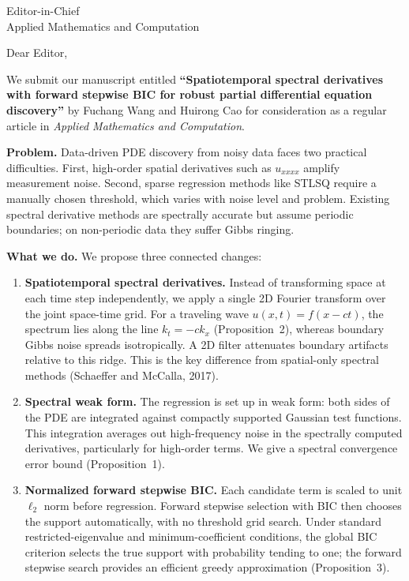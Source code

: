 \documentclass[12pt]{letter}
\begin{document}
\begin{letter}{Editor-in-Chief\\
Applied Mathematics and Computation}

\opening{Dear Editor,}

We submit our manuscript entitled \textbf{``Spatiotemporal spectral derivatives with forward stepwise BIC for robust partial differential equation discovery''} by Fuchang Wang and Huirong Cao for consideration as a regular article in \textit{Applied Mathematics and Computation}.

\textbf{Problem.} Data-driven PDE discovery from noisy data faces two practical difficulties. First, high-order spatial derivatives such as $u_{xxxx}$ amplify measurement noise. Second, sparse regression methods like STLSQ require a manually chosen threshold, which varies with noise level and problem. Existing spectral derivative methods are spectrally accurate but assume periodic boundaries; on non-periodic data they suffer Gibbs ringing.

\textbf{What we do.} We propose three connected changes:

\begin{enumerate}
\item \textbf{Spatiotemporal spectral derivatives.} Instead of transforming space at each time step independently, we apply a single 2D Fourier transform over the joint space-time grid. For a traveling wave $u(x,t)=f(x-ct)$, the spectrum lies along the line $k_t=-ck_x$ (Proposition~2), whereas boundary Gibbs noise spreads isotropically. A 2D filter attenuates boundary artifacts relative to this ridge. This is the key difference from spatial-only spectral methods (Schaeffer and McCalla, 2017).

\item \textbf{Spectral weak form.} The regression is set up in weak form: both sides of the PDE are integrated against compactly supported Gaussian test functions. This integration averages out high-frequency noise in the spectrally computed derivatives, particularly for high-order terms. We give a spectral convergence error bound (Proposition~1).

\item \textbf{Normalized forward stepwise BIC.} Each candidate term is scaled to unit $\ell_2$ norm before regression. Forward stepwise selection with BIC then chooses the support automatically, with no threshold grid search. Under standard restricted-eigenvalue and minimum-coefficient conditions, the global BIC criterion selects the true support with probability tending to one; the forward stepwise search provides an efficient greedy approximation (Proposition~3).
\end{enumerate}


\end{letter}
\end{document}
